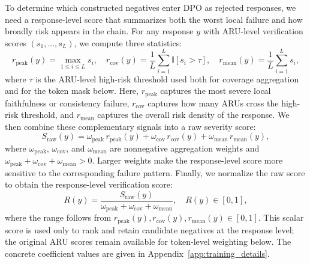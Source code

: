 \documentclass[a4paper,fleqn,doubleblind]{cas-sc}
\begin{document}
To determine which constructed negatives enter DPO as rejected responses, we need a response-level score that summarizes both the worst local failure and how broadly risk appears in the chain. For any response $y$ with ARU-level verification scores $(s_1,\dots,s_L)$, we compute three statistics:
\begin{equation}
\label{eq:severity_components}
r_{\text{peak}}(y)=\max_{1 \le i \le L} s_i, \quad
r_{\text{cov}}(y)=\frac{1}{L}\sum_{i=1}^{L}\mathbb{I}[s_i>\tau], \quad
r_{\text{mean}}(y)=\frac{1}{L}\sum_{i=1}^{L} s_i,
\end{equation}
where $\tau$ is the ARU-level high-risk threshold used both for coverage aggregation and for the token mask below. Here, $r_{\text{peak}}$ captures the most severe local faithfulness or consistency failure, $r_{\text{cov}}$ captures how many ARUs cross the high-risk threshold, and $r_{\text{mean}}$ captures the overall risk density of the response. We then combine these complementary signals into a raw severity score:
\begin{equation}
\label{eq:severity_raw}
S_{\text{raw}}(y)=\omega_{\text{peak}} \, r_{\text{peak}}(y)+\omega_{\text{cov}} \, r_{\text{cov}}(y)+\omega_{\text{mean}} \, r_{\text{mean}}(y),
\end{equation}
where $\omega_{\text{peak}}$, $\omega_{\text{cov}}$, and $\omega_{\text{mean}}$ are nonnegative aggregation weights and $\omega_{\text{peak}}+\omega_{\text{cov}}+\omega_{\text{mean}}>0$. Larger weights make the response-level score more sensitive to the corresponding failure pattern. Finally, we normalize the raw score to obtain the response-level verification score:
\begin{equation}
\label{eq:faithfulness_risk_score}
R(y)=\frac{S_{\text{raw}}(y)}{\omega_{\text{peak}}+\omega_{\text{cov}}+\omega_{\text{mean}}}, \quad R(y)\in [0,1],
\end{equation}
where the range follows from $r_{\text{peak}}(y),r_{\text{cov}}(y),r_{\text{mean}}(y)\in[0,1]$. This scalar score is used only to rank and retain candidate negatives at the response level; the original ARU scores remain available for token-level weighting below. The concrete coefficient values are given in Appendix~\ref{app:training_details}.
\end{document}
